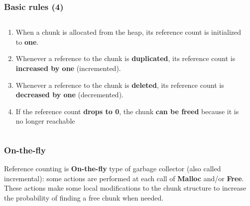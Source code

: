 \documentclass[presentation]{beamer}
\begin{document}
\begin{frame}
  \frametitle{Basic rules (4)}
  \begin{columns}
    \begin{column}{0.5\textwidth}
      \begin{enumerate}
        \color{gray} \item When a chunk is allocated from the heap, its reference count is initialized to \textbf{one}. 
        \color{gray} \item Whenever a reference to the chunk is \textbf{duplicated}, its reference count is \textbf{increased by one} (incremented).
        \color{gray} \item Whenever a reference to the chunk is \textbf{deleted}, its reference count is \textbf{decreased by one} (decremented).
        \color{black} \item If the reference count \textbf{drops to 0}, the chunk \textbf{can be freed} because it is no longer reachable
      \end{enumerate}
    \end{column}
    \begin{column}{0.5\textwidth} 
    \end{column}
  \end{columns}
\end{frame}

\begin{frame}
  \frametitle{On-the-fly} 
  \justifying
Reference counting is \textbf{On-the-fly} type of garbage collector (also called incremental): some actions are performed at each call of \textbf{Malloc} and/or \textbf{Free}. These actions make some local modifications to the chunk structure to increase the probability of finding a free chunk
when needed.
\end{frame}
\end{document}
